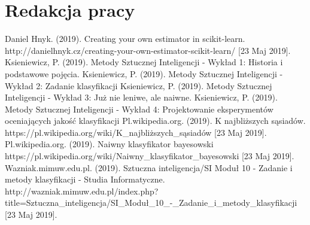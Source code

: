\documentclass[12pt,onecolumn,technote]{IEEEtran}
\begin{document}
\section{Redakcja pracy}

\begin{thebibliography}{00}
 Daniel Hnyk. (2019). Creating your own estimator in scikit-learn. http://danielhnyk.cz/creating-your-own-estimator-scikit-learn/ [23 Maj 2019].
 Ksieniewicz, P. (2019). Metody Sztucznej Inteligencji - Wykład 1: Historia i podstawowe pojęcia. 
 Ksieniewicz, P. (2019). Metody Sztucznej Inteligencji - Wykład 2: Zadanie klasyfikacji
 Ksieniewicz, P. (2019). Metody Sztucznej Inteligencji - Wykład 3: Już nie leniwe, ale naiwne. 
 Ksieniewicz, P. (2019). Metody Sztucznej Inteligencji - Wykład 4: Projektowanie eksperymentów oceniających jakość klasyfikacji
 Pl.wikipedia.org. (2019). K najbliższych sąsiadów. https://pl.wikipedia.org/wiki/K\_najbliższych\_sąsiadów [23 Maj 2019].
 Pl.wikipedia.org. (2019). Naiwny klasyfikator bayesowski https://pl.wikipedia.org/wiki/Naiwny\_klasyfikator\_bayesowski [23 Maj 2019].
 Wazniak.mimuw.edu.pl. (2019). Sztuczna inteligencja/SI Moduł 10 - Zadanie i metody klasyfikacji - 
Studia Informatyczne. http://wazniak.mimuw.edu.pl/index.php?title=Sztuczna\_inteligencja/SI\_Moduł\_10\_-\_Zadanie\_i\_metody\_klasyfikacji [23 Maj 2019].
\end{thebibliography}
\end{document}
